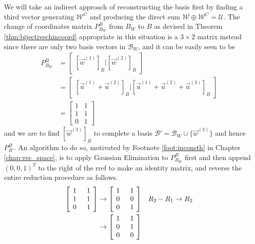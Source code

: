 \begin{solution}
We will take an indirect approach of reconstructing the basis first by finding a third vector generating $\mathcal{W}^C$ and producing the direct sum $\mathcal{W} \oplus \mathcal{W}^C = \mathcal{U}$. The change of coordinates matrix $P_{B_W}^{B}$ from $B_W$ to $B$ as devised in Theorem \ref{thm:bijectivechincoord} appropriate in this situation is a $3 \times 2$ matrix instead since there are only two basis vectors in $\mathcal{B}_W$, and it can be easily seen to be
\begin{align*}
P_{B_W}^{B} &= \begin{bmatrix}
[\vec{w}^{(1)}]_B | [\vec{w}^{(2)}]_B
\end{bmatrix} \\
&= \begin{bmatrix}
[\vec{u}^{(1)} + \vec{u}^{(2)}]_B | [\vec{u}^{(1)} + \vec{u}^{(2)} + \vec{u}^{(3)}]_B
\end{bmatrix} \\
&= \begin{bmatrix}
1 & 1 \\
1 & 1 \\
0 & 1
\end{bmatrix}
\end{align*}
and we are to find $[\vec{w}^{(3)}]_B$ to complete a basis $\mathcal{B}' = \mathcal{B}_W \cup \{\vec{w}^{(3)}\}$ and hence $P_{B'}^{B}$. An algorithm to do so, motivated by Footnote \ref{foot:inconsth} in Chapter \ref{chap:vec_space}, is to apply Gaussian Elimination to $P_{B_W}^{B}$ first and then append 
$(0,0,1)^T$ to the right of the rref to make an identity matrix, and reverse the entire reduction procedure as follows.
\begin{align*}
\left[\begin{array}{@{\,}wc{10pt}wc{10pt}@{\,}}
1 & 1 \\
1 & 1 \\
0 & 1
\end{array}\right] &\to
\left[\begin{array}{@{\,}wc{10pt}wc{10pt}@{\,}}
1 & 1 \\
0 & 0 \\
0 & 1
\end{array}\right] 
& R_2 - R_1 \to R_2 \\
&\to \left[\begin{array}{@{\,}wc{10pt}wc{10pt}@{\,}}
1 & 1 \\
0 & 1 \\
0 & 0
\end{array}\right]

\end{align*}
\end{solution}
